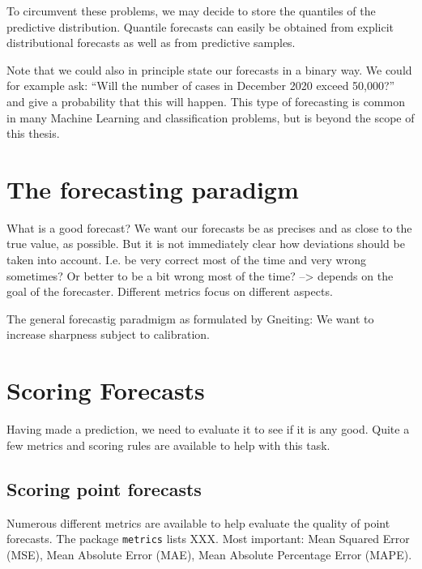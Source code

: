 \documentclass[
]{book}
\begin{document}
To circumvent these problems, we may decide to store the quantiles of the predictive distribution. Quantile forecasts can easily be obtained from explicit distributional forecasts as well as from predictive samples.

Note that we could also in principle state our forecasts in a binary way. We could for example ask: ``Will the number of cases in December 2020 exceed 50,000?'' and give a probability that this will happen. This type of forecasting is common in many Machine Learning and classification problems, but is beyond the scope of this thesis.

\hypertarget{the-forecasting-paradigm}{%
\section{The forecasting paradigm}\label{the-forecasting-paradigm}}

What is a good forecast? We want our forecasts be as precises and as close to the true value, as possible. But it is not immediately clear how deviations should be taken into account. I.e. be very correct most of the time and very wrong sometimes? Or better to be a bit wrong most of the time? --\textgreater{} depends on the goal of the forecaster. Different metrics focus on different aspects.

The general forecastig paradmigm as formulated by Gneiting: We want to increase sharpness subject to calibration.

\hypertarget{scoring-forecasts}{%
\section{Scoring Forecasts}\label{scoring-forecasts}}

Having made a prediction, we need to evaluate it to see if it is any good. Quite a few metrics and scoring rules are available to help with this task.

\hypertarget{scoring-point-forecasts}{%
\subsection{Scoring point forecasts}\label{scoring-point-forecasts}}

Numerous different metrics are available to help evaluate the quality of point forecasts. The package \texttt{metrics} lists XXX. Most important: Mean Squared Error (MSE), Mean Absolute Error (MAE), Mean Absolute Percentage Error (MAPE).
\end{document}
